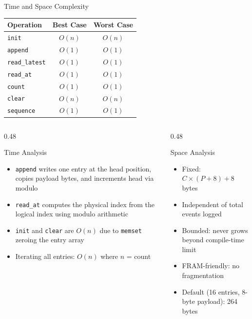 \documentclass[aspectratio=169, 10pt]{beamer}
\begin{document}
\begin{frame}{Time and Space Complexity}
\begin{table}
\centering
\begin{tabular}{@{}lcc@{}}
\toprule
\textbf{Operation} & \textbf{Best Case} & \textbf{Worst Case} \\
\midrule
\texttt{init}          & $O(n)$ & $O(n)$ \\
\texttt{append}        & $O(1)$ & $O(1)$ \\
\texttt{read\_latest}  & $O(1)$ & $O(1)$ \\
\texttt{read\_at}      & $O(1)$ & $O(1)$ \\
\texttt{count}         & $O(1)$ & $O(1)$ \\
\texttt{clear}         & $O(n)$ & $O(n)$ \\
\texttt{sequence}      & $O(1)$ & $O(1)$ \\
\bottomrule
\end{tabular}
\end{table}

\vspace{0.5em}
\begin{columns}[T]
\begin{column}{0.48\textwidth}
\begin{block}{Time Analysis}
\begin{itemize}
  \item \texttt{append} writes one entry at the head position,
        copies payload bytes, and increments head via modulo
  \item \texttt{read\_at} computes the physical index from the
        logical index using modulo arithmetic
  \item \texttt{init} and \texttt{clear} are $O(n)$ due to
        \texttt{memset} zeroing the entry array
  \item Iterating all entries: $O(n)$ where $n$ = count
\end{itemize}
\end{block}
\end{column}

\begin{column}{0.48\textwidth}
\begin{block}{Space Analysis}
\begin{itemize}
  \item Fixed: $C \times (P + 8) + 8$ bytes
  \item Independent of total events logged
  \item Bounded: never grows beyond compile-time limit
  \item FRAM-friendly: no fragmentation
  \item Default (16 entries, 8-byte payload): 264 bytes
\end{itemize}
\end{block}
\end{column}
\end{columns}
\end{frame}
\end{document}
